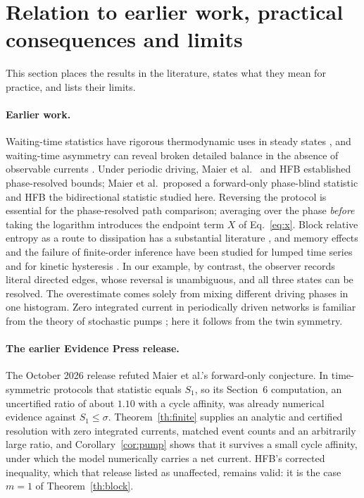 \documentclass[11pt,a4paper]{article}
\begin{document}
\section{Relation to earlier work, practical consequences and limits}\label{sec:discussion}
This section places the results in the literature, states what they mean for practice, and lists their limits.

\paragraph{Earlier work.} Waiting-time statistics have rigorous thermodynamic uses in steady states \cite{vandermeer,harunari2022,skinner,snippets}, and waiting-time asymmetry can reveal broken detailed balance in the absence of observable currents \cite{martinez}. Under periodic driving, Maier et al.\ \cite{maier} and HFB \cite{hfb} established phase-resolved bounds; Maier et al.\ proposed a forward-only phase-blind statistic and HFB the bidirectional statistic studied here. Reversing the protocol is essential for the phase-resolved path comparison; averaging over the phase \emph{before} taking the logarithm introduces the endpoint term $X$ of Eq.~\eqref{eq:x}. Block relative entropy as a route to dissipation has a substantial literature \cite{roldan}, and memory effects and the failure of finite-order inference have been studied for lumped time series \cite{schwarz} and for kinetic hysteresis \cite{hartich}. In our example, by contrast, the observer records literal directed edges, whose reversal is unambiguous, and all three states can be resolved. The overestimate comes solely from mixing different driving phases in one histogram. Zero integrated current in periodically driven networks is familiar from the theory of stochastic pumps \cite{rahav,chernyak}; here it follows from the twin symmetry.

\paragraph{The earlier Evidence Press release.} The October 2026 release \cite{ep} refuted Maier et al.'s forward-only conjecture. In time-symmetric protocols that statistic equals $S_1$, so its Section~6 computation, an uncertified ratio of about $1.10$ with a cycle affinity, was already numerical evidence against $S_1\le\sigma$. Theorem~\ref{th:finite} supplies an analytic and certified resolution with zero integrated currents, matched event counts and an arbitrarily large ratio, and Corollary~\ref{cor:pump} shows that it survives a small cycle affinity, under which the model numerically carries a net current. HFB's corrected inequality, which that release listed as unaffected, remains valid: it is the case $m=1$ of Theorem~\ref{th:block}.
\end{document}
